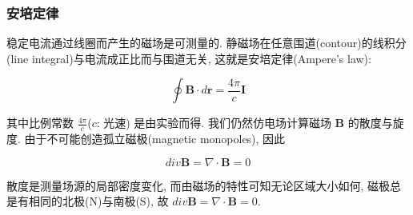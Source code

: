 \documentclass[aspectratio=2516]{beamer}
\begin{document}

\begin{frame}
\frametitle{\kaishu 安培定律}
\kaishu

\small 

稳定电流通过线圈而产生的磁场是可测量的. 静磁场在任意围道(contour)的线积分(line integral)与电流成正比而与围道无关, 这就是安培定律(Ampere's law):

\begin{equation}
\oint {\boldsymbol{B} \cdot d\boldsymbol{r}}  = \frac{{4\pi }}{c}\boldsymbol{I}
\label{eq5.4.16}
\end{equation}

其中比例常数 $\frac{{4\pi }}{c}$($ c $: 光速) 是由实验而得. 我们仍然仿电场计算磁场 $ \boldsymbol{B} $ 的散度与旋度. 由于不可能创造孤立磁极(magnetic monopoles), 因此

\begin{equation}
div \boldsymbol{B} = \nabla \cdot \boldsymbol{B} = 0
\label{eq5.4.17}
\end{equation}

散度是测量场源的局部密度变化, 而由磁场的特性可知无论区域大小如何, 磁极总是有相同的北极(N)与南极(S), 故 $ div \boldsymbol{B} = \nabla \cdot \boldsymbol{B} = 0 $.


\end{frame}

\end{document}
